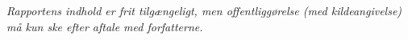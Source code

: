 \vfill

{\footnotesize\itshape \noindent Rapportens indhold er frit tilgængeligt, men offentliggørelse (med kildeangivelse) må kun ske efter aftale med forfatterne.}

